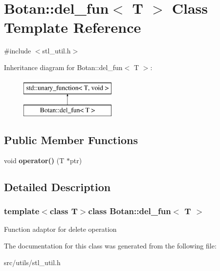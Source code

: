 \hypertarget{classBotan_1_1del__fun}{\section{Botan\-:\-:del\-\_\-fun$<$ T $>$ Class Template Reference}
\label{classBotan_1_1del__fun}
}


{\ttfamily \#include $<$stl\-\_\-util.\-h$>$}

Inheritance diagram for Botan\-:\-:del\-\_\-fun$<$ T $>$\-:\begin{figure}[H]
\begin{center}
\leavevmode
\includegraphics[height=2.000000cm]{classBotan_1_1del__fun}
\end{center}
\end{figure}
\subsection*{Public Member Functions}
\begin{DoxyCompactItemize}
\item 
\hypertarget{classBotan_1_1del__fun_a6b93e54f244292a316641ae5eb64517d}{void {\bfseries operator()} (T $\ast$ptr)}\label{classBotan_1_1del__fun_a6b93e54f244292a316641ae5eb64517d}

\end{DoxyCompactItemize}


\subsection{Detailed Description}
\subsubsection*{template$<$class T$>$class Botan\-::del\-\_\-fun$<$ T $>$}

Function adaptor for delete operation 

The documentation for this class was generated from the following file\-:\begin{DoxyCompactItemize}
\item 
src/utils/stl\-\_\-util.\-h\end{DoxyCompactItemize}
